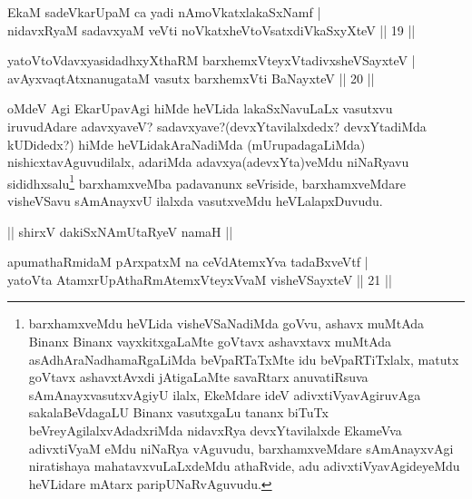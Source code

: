 
\begin{shl}
EkaM sadeVkarUpaM ca yadi nAmoVkatxlakaSxNamf |\\
nidavxRyaM sadavxyaM veVti noVkatxheVtoVsatxdiVkaSxyXteV \hfill || 19 ||
\end{shl}

\begin{shl}
yatoV\s toV\s davxyasidadhxyXthaRM barxhemxVteyxVtadivxsheVSayxteV |\\
avAyxvaqtAtxnanugataM vasutx barxhemxVti BaNayxteV \hfill || 20 ||
\end{shl}

\begin{artha}
oMdeV Agi EkarUpavAgi hiMde heVLida lakaSxNavuLaLx vasutxvu iruvudAdare adavxyaveV? sadavxyave?(devxYtavilalxdedx? devxYtadiMda kUDidedx?) hiMde heVLidakAraNadiMda (mUrupadagaLiMda) nishicxtavAguvudilalx, adariMda adavxya(adevxYta)veMdu niNaRyavu sididhxsalu\footnote{barxhamxveMdu heVLida visheVSaNadiMda goVvu, ashavx muMtAda Binanx Binanx vayxkitxgaLaMte goVtavx ashavxtavx muMtAda asAdhAraNadhamaRgaLiMda beVpaRTaTxMte idu beVpaRTiTxlalx, matutx goVtavx ashavxtAvxdi jAtigaLaMte savaRtarx anuvatiRsuva sAmAnayxvasutxvAgiyU ilalx, EkeMdare ideV adivxtiVyavAgiruvAga sakalaBeVdagaLU Binanx vasutxgaLu tananx biTuTx beVreyAgilalxvAdadxriMda nidavxRya devxYtavilalxde EkameVva adivxtiVyaM eMdu niNaRya vAguvudu, barxhamxveMdare sAmAnayxvAgi niratishaya mahatavxvuLaLxdeMdu athaRvide, adu adivxtiVyavAgideyeMdu heVLidare mAtarx paripUNaRvAguvudu.} barxhamxveMba padavanunx seVriside, barxhamxveMdare visheVSavu sAmAnayxvU ilalxda vasutxveMdu heVLalapxDuvudu.
\end{artha}



\begin{center}
|| shirxV dakiSxNAmUtaRyeV namaH ||
\end{center}



\begin{shl}
apumathaRmidaM pArxpatxM na ceVdAtemxYva tadaBxveVtf |\\
yatoV\s ta AtamxrUpAthaRmAtemxVteyxVvaM visheVSayxteV \hfill || 21 ||
\end{shl}

